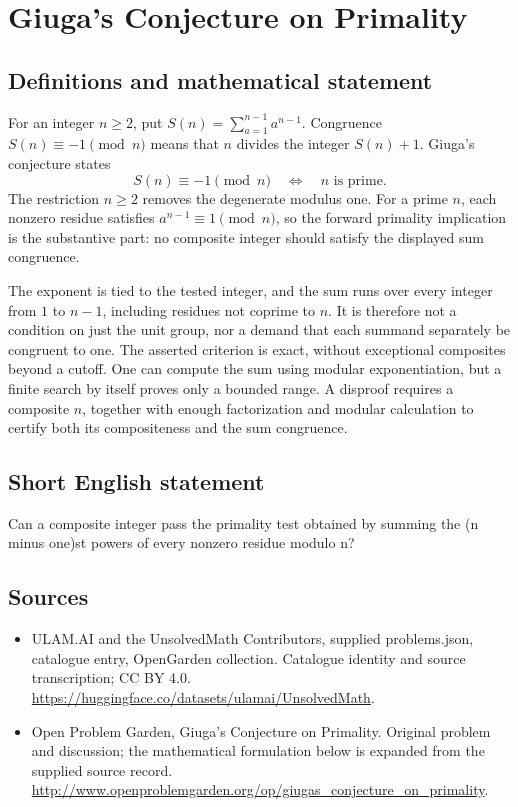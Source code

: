 \documentclass[11pt,a4paper]{article}
\begin{document}
\section*{Giuga's Conjecture on Primality}\label{statement}

\subsection{Definitions and mathematical statement}
For an integer $n\ge2$, put $S(n)=\sum_{a=1}^{n-1}a^{n-1}$.
Congruence $S(n)\equiv-1\pmod n$ means that $n$ divides the integer
$S(n)+1$. Giuga's conjecture states
\[
 S(n)\equiv-1\pmod n\quad\Longleftrightarrow\quad n\text{ is prime}.
\]
The restriction $n\ge2$ removes the degenerate modulus one. For a
prime $n$, each nonzero residue satisfies $a^{n-1}\equiv1\pmod n$,
so the forward primality implication is the substantive part:
no composite integer should satisfy the displayed sum congruence.

The exponent is tied to the tested integer, and the sum runs over
every integer from $1$ to $n-1$, including residues not coprime to $n$.
It is therefore not a condition on just the unit group, nor a demand
that each summand separately be congruent to one. The asserted
criterion is exact, without exceptional composites beyond a cutoff.
One can compute the sum using modular exponentiation, but a finite
search by itself proves only a bounded range. A disproof requires
a composite $n$, together with enough factorization and modular
calculation to certify both its compositeness and the sum congruence.
\subsection{Short English statement}
Can a composite integer pass the primality test obtained by summing the (n minus one)st powers of every nonzero residue modulo n?
\subsection{Sources}
\begin{itemize}
\item[S1] ULAM.AI and the UnsolvedMath Contributors, supplied problems.json, catalogue entry, OpenGarden collection. Catalogue identity and source transcription; CC BY 4.0.
\url{https://huggingface.co/datasets/ulamai/UnsolvedMath}.
\item[S2] Open Problem Garden, Giuga's Conjecture on Primality. Original problem and discussion; the mathematical formulation below is expanded from the supplied source record.
\url{http://www.openproblemgarden.org/op/giugas_conjecture_on_primality}.
\end{itemize}
\end{document}
